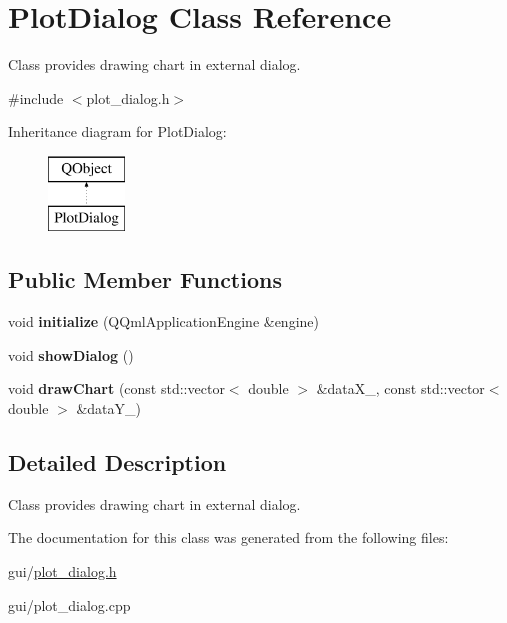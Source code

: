 \hypertarget{class_plot_dialog}{}\section{Plot\+Dialog Class Reference}
\label{class_plot_dialog}


Class provides drawing chart in external dialog.  




{\ttfamily \#include $<$plot\+\_\+dialog.\+h$>$}

Inheritance diagram for Plot\+Dialog\+:\begin{figure}[H]
\begin{center}
\leavevmode
\includegraphics[height=2.000000cm]{class_plot_dialog}
\end{center}
\end{figure}
\subsection*{Public Member Functions}
\begin{DoxyCompactItemize}
\item 
\hypertarget{class_plot_dialog_ae5fb95c5336b5dd2267101dd181989a5}{}\label{class_plot_dialog_ae5fb95c5336b5dd2267101dd181989a5} 
void {\bfseries initialize} (Q\+Qml\+Application\+Engine \&engine)
\item 
\hypertarget{class_plot_dialog_a7b5d5b476275028bf4186e737d50ebbe}{}\label{class_plot_dialog_a7b5d5b476275028bf4186e737d50ebbe} 
void {\bfseries show\+Dialog} ()
\item 
\hypertarget{class_plot_dialog_a5bb43876e8c339604c4827d536a54726}{}\label{class_plot_dialog_a5bb43876e8c339604c4827d536a54726} 
void {\bfseries draw\+Chart} (const std\+::vector$<$ double $>$ \&data\+X\+\_\+, const std\+::vector$<$ double $>$ \&data\+Y\+\_\+)
\end{DoxyCompactItemize}


\subsection{Detailed Description}
Class provides drawing chart in external dialog. 

The documentation for this class was generated from the following files\+:\begin{DoxyCompactItemize}
\item 
gui/\hyperlink{plot__dialog_8h}{plot\+\_\+dialog.\+h}\item 
gui/plot\+\_\+dialog.\+cpp\end{DoxyCompactItemize}
